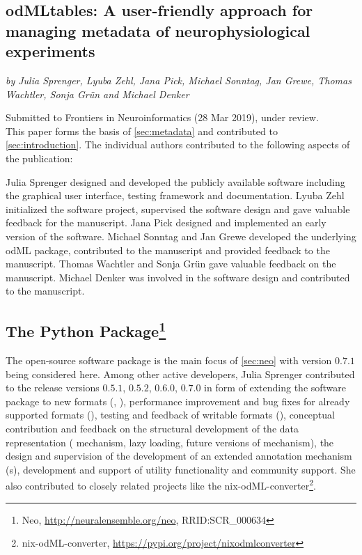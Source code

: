 \subsection*{odMLtables: A user-friendly approach for managing metadata of neurophysiological experiments}
\textit{by Julia Sprenger, Lyuba Zehl, Jana Pick, Michael Sonntag, Jan Grewe, Thomas Wachtler, Sonja Grün and Michael Denker}

Submitted to Frontiers in Neuroinformatics (28 Mar 2019), under review.\\

This paper forms the basis of \cref{sec:metadata} and contributed to \cref{sec:introduction}. The individual authors contributed to the following aspects of the publication:

Julia Sprenger designed and developed the publicly available software including the graphical user interface, testing framework and documentation. Lyuba Zehl initialized the software project, supervised the software design and gave valuable feedback for the manuscript. Jana Pick designed and implemented an early version of the software. Michael Sonntag and Jan Grewe developed the underlying odML package, contributed to the manuscript and provided feedback to the manuscript. Thomas Wachtler and Sonja Grün gave valuable feedback on the manuscript. Michael Denker was involved in the software design and contributed to the manuscript.

\subsection*{The  Python Package\footnote{Neo, \url{http://neuralensemble.org/neo}, RRID:SCR\_000634}}
The open-source software package  \citep{Garcia_2014} is the main focus of \cref{sec:neo}  with version $0.7.1$ being considered here. Among other active  developers, Julia Sprenger contributed to the release versions $0.5.1$, $0.5.2$, $0.6.0$, $0.7.0$ in form of extending the software package to new formats (, ), performance improvement and bug fixes for already supported formats (), testing and feedback of writable formats (), conceptual contribution and feedback on the structural development of the data representation ( mechanism, lazy loading, future versions of  mechanism), the design and supervision of the development of an extended annotation mechanism (s), development and support of utility functionality and community support. She also contributed to closely related projects like the nix-odML-converter\footnote{nix-odML-converter, \url{https://pypi.org/project/nixodmlconverter}}.


